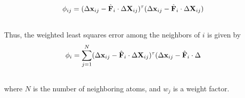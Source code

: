 \documentclass[letterpaper,10pt,english]{sphinxmanual}
\begin{document}
\begin{gather}
\begin{split}\phi_{ij} = (\Delta {\bf x}_{ij} - \hat{\bf F}_{i} \cdot \Delta {\bf X}_{ij})^{\tau} (\Delta {\bf x}_{ij} - \hat{\bf F}_{i} \cdot \Delta {\bf X}_{ij})\end{split}\notag\\\begin{split}\end{split}\notag
\end{gather}
Thus, the weighted least squares error among the neighbors of $i$ is given by
\begin{gather}
\begin{split}\phi_{i} = \sum_{j=1}^{N}(\Delta {\bf x}_{ij} - \hat{\bf F}_{i} \cdot \Delta {\bf X}_{ij})^{\tau} (\Delta {\bf x}_{ij} - \hat{\bf F}_{i} \cdot \Delta\end{split}\notag\\\begin{split}\end{split}\notag
\end{gather}
where $N$ is the number of neighboring atoms, and $w_j$ is a weight factor.
\end{document}
